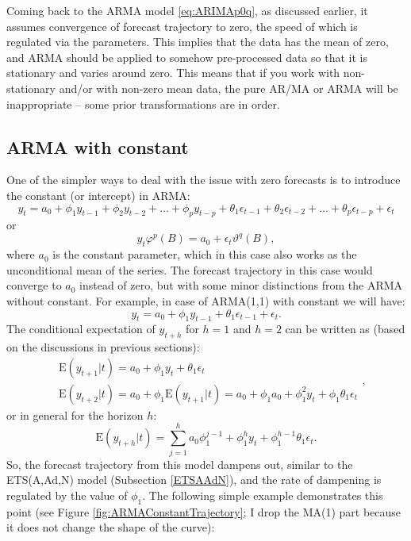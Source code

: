 \documentclass[
]{book}
\theoremstyle{definition}
\theoremstyle{definition}
\theoremstyle{definition}
\theoremstyle{definition}
\theoremstyle{remark}
\begin{document}
Coming back to the ARMA model \eqref{eq:ARIMAp0q}, as discussed earlier, it assumes convergence of forecast trajectory to zero, the speed of which is regulated via the parameters. This implies that the data has the mean of zero, and ARMA should be applied to somehow pre-processed data so that it is stationary and varies around zero. This means that if you work with non-stationary and/or with non-zero mean data, the pure AR/MA or ARMA will be inappropriate -- some prior transformations are in order.

\hypertarget{ARMAConstant}{%
\subsection{ARMA with constant}\label{ARMAConstant}}

One of the simpler ways to deal with the issue with zero forecasts is to introduce the constant (or intercept) in ARMA:
\begin{equation}
  {y}_{t} = a_0 + \phi_1 y_{t-1} + \phi_2 y_{t-2} + \dots + \phi_p y_{t-p} + \theta_1 \epsilon_{t-1} + \theta_2 \epsilon_{t-2} + \dots + \theta_p \epsilon_{t-p} + \epsilon_t 
  \label{eq:ARIMAp0qExample}
\end{equation}
or
\begin{equation}
  {y}_{t} \varphi^p(B) = a_0 + \epsilon_t \vartheta^q(B) ,
  \label{eq:ARIMAp0qCompactConstant}
\end{equation}
where \(a_0\) is the constant parameter, which in this case also works as the unconditional mean of the series. The forecast trajectory in this case would converge to \(a_0\) instead of zero, but with some minor distinctions from the ARMA without constant. For example, in case of ARMA(1,1) with constant we will have:
\begin{equation}
  {y}_{t} = a_0 + \phi_1 y_{t-1} + \theta_1 \epsilon_{t-1} + \epsilon_t .
  \label{eq:ARIMA101ConstExample01}
\end{equation}
The conditional expectation of \(y_{t+h}\) for \(h=1\) and \(h=2\) can be written as (based on the discussions in previous sections):
\begin{equation}
\begin{aligned}
  & \mathrm{E}({y}_{t+1}|t) = a_0 + \phi_1 y_{t} + \theta_1 \epsilon_{t} \\
  & \mathrm{E}({y}_{t+2}|t) = a_0 + \phi_1 \mathrm{E}(y_{t+1}|t) = a_0 + \phi_1 a_0 + \phi_1^2 y_{t} + \phi_1 \theta_1 \epsilon_t
\end{aligned} ,
  \label{eq:ARIMA101ConstExampleForecasth1}
\end{equation}
or in general for the horizon \(h\):
\begin{equation}
  \mathrm{E}({y}_{t+h}|t) = \sum_{j=1}^h a_0\phi_1^{j-1} + \phi_1^h y_{t} + \phi_1^{h-1} \theta_1 \epsilon_{t} .
  \label{eq:ARIMA101ConstExampleForecast}
\end{equation}
So, the forecast trajectory from this model dampens out, similar to the ETS(A,Ad,N) model (Subsection \ref{ETSAAdN}), and the rate of dampening is regulated by the value of \(\phi_1\). The following simple example demonstrates this point (see Figure \ref{fig:ARMAConstantTrajectory}; I drop the MA(1) part because it does not change the shape of the curve):
\end{document}
